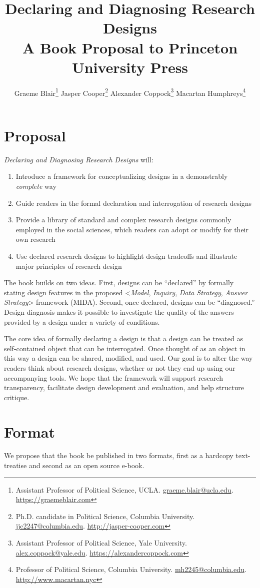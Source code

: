 \documentclass[11pt]{article}
\title{Declaring and Diagnosing Research Designs \\ {\normalsize A Book Proposal to Princeton University Press}}
\author{Graeme Blair\footnote{Assistant Professor of Political Science, UCLA. \href{mailto:graeme.blair@ucla.edu}{graeme.blair@ucla.edu}. \url{https://graemeblair.com}} \quad 
Jasper Cooper\footnote{Ph.D. candidate in Political Science, Columbia University. \href{mailto:jjc2247@columbia.edu}{jjc2247@columbia.edu}. \url{http://jasper-cooper.com}} \quad 
Alexander Coppock\footnote{Assistant Professor of Political Science, Yale University. \href{mailto:alex.coppock@yale.edu}{alex.coppock@yale.edu}. \url{https://alexandercoppock.com}} \quad 
\setcounter{footnote}{7}
Macartan Humphreys\footnote{Professor of Political Science, Columbia University. \href{mailto:mh2245@columbia.edu}{mh2245@columbia.edu}. \url{http://www.macartan.nyc}}   }
\begin{document}
\maketitle


\section{Proposal}

\noindent \textit{Declaring and Diagnosing Research Designs} will:
\begin{enumerate}
	\item Introduce a framework for conceptualizing designs in a demonstrably \textit{complete} way
	\item Guide readers in the formal declaration and interrogation of research designs
	\item Provide a library of standard and complex research designs commonly employed in the social sciences, which readers can adopt or modify for their own research
	\item Use declared research designs to highlight design tradeoffs and illustrate major principles of research design
\end{enumerate}

The book builds on two ideas. First, designs can be ``declared'' by formally stating design features in the proposed <\textit{Model}, \textit{Inquiry}, \textit{Data Strategy}, \textit{Answer Strategy}> framework (MIDA). Second, once declared, designs can be ``diagnosed.'' Design diagnosis makes it possible to investigate the quality of the answers provided by a design under a variety of conditions.   

The core idea of formally declaring a design is that a design can be treated as self-contained object that can be interrogated. Once thought of as an object in this way a design can be shared, modified, and used. Our goal is to alter the way readers think about research designs, whether or not they end up using our accompanying tools. We hope that the framework will support research transparency, facilitate design development and evaluation, and help structure critique. 

\section{Format}

We propose that the book be published in two formats, first as a hardcopy text-treatise and second as an open source e-book.  
\end{document}
